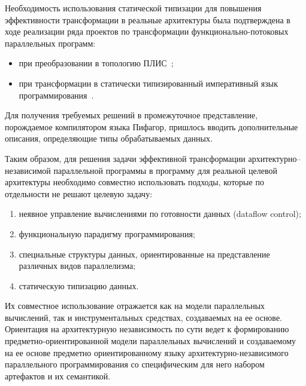 Необходимость использования статической типизации для повышения эффективности трансформации в реальные архитектуры была подтверждена в ходе реализации ряда проектов по трансформации функционально-потоковых параллельных программ:
\begin{itemize}
	\item при преобразовании в топологию ПЛИС~\cite{romanova2022};
	\item при трансформации в статически типизированный императивный язык программирования~\cite{transform}.
\end{itemize}
Для получения требуемых решений в промежуточное представление, порождаемое компилятором языка Пифагор, пришлось вводить дополнительные описания, определяющие типы обрабатываемых данных.

Таким образом, для решения задачи эффективной трансформации архитектурно--не\-за\-ви\-си\-мой параллельной программы в программу для реальной целевой архитектуры необходимо совместно использовать подходы, которые по отдельности не решают целевую задачу: \begin{enumerate}
	\item неявное управление вычислениями по готовности данных (dataflow control);
	\item функциональную парадигму программирования;
	\item специальные структуры данных, ориентированные на представление различных видов параллелизма;
	\item статическую типизацию данных.
\end{enumerate}
Их совместное использование отражается как на модели параллельных вычислений, так и инструментальных средствах, создаваемых на ее основе. Ориентация на архитектурную независимость по сути ведет к формированию предметно-ориентированной модели параллельных вычислений и создаваемому на ее основе предметно ориентированному языку архитектурно-независимого параллельного программирования со специфическим для него набором артефактов и их семантикой.